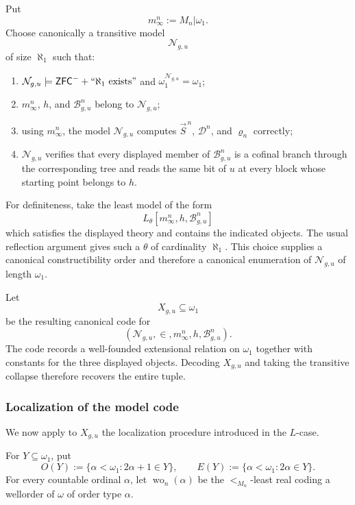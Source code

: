 \documentclass[a4paper,11pt]{article}
\newcommand{\ZFCminus}{\mathsf{ZFC}^{-}}
\begin{document}
Put
\[
   m^n_\infty:=M_n|\omega_1.
\]
Choose canonically a transitive model
\[
   \mathcal N_{g,u}
\]
of size $\aleph_1$ such that:
\begin{enumerate}
   \item
   $\mathcal N_{g,u}\models
      \ZFCminus+``\aleph_1\text{ exists}"$
   and $\omega_1^{\mathcal N_{g,u}}=\omega_1$;

   \item
   $m^n_\infty$, $h$, and $\mathcal B^n_{g,u}$ belong to
   $\mathcal N_{g,u}$;

   \item using $m^n_\infty$, the model $\mathcal N_{g,u}$ computes
   $\vec S^{\,n}$, $\mathcal D^n$, and $\varrho_n$ correctly;

   \item $\mathcal N_{g,u}$ verifies that every displayed member of
   $\mathcal B^n_{g,u}$ is a cofinal branch through the corresponding tree
   and reads the same bit of $u$ at every block whose starting point belongs
   to $h$.
\end{enumerate}
For definiteness, take the least model of the form
\[
   L_\theta[m^n_\infty,h,\mathcal B^n_{g,u}]
\]
which satisfies the displayed theory and contains the indicated objects.
The usual reflection argument gives such a $\theta$ of cardinality
$\aleph_1$.  This choice supplies a canonical constructibility order and
therefore a canonical enumeration of $\mathcal N_{g,u}$ of length
$\omega_1$.

Let
\[
   X_{g,u}\subseteq\omega_1
\]
be the resulting canonical code for
\[
   (\mathcal N_{g,u},\in,
       m^n_\infty,h,\mathcal B^n_{g,u}).
\]
The code records a well-founded extensional relation on $\omega_1$ together
with constants for the three displayed objects.  Decoding $X_{g,u}$ and taking
the transitive collapse therefore recovers the entire tuple.

\subsubsection*{Localization of the model code}

We now apply to $X_{g,u}$ the localization procedure introduced in the
$L$-case.

For $Y\subseteq\omega_1$, put
\[
   O(Y):=\{\alpha<\omega_1:2\alpha+1\in Y\},
   \qquad
   E(Y):=\{\alpha<\omega_1:2\alpha\in Y\}.
\]
For every countable ordinal $\alpha$, let $\operatorname{wo}_n(\alpha)$ be
the $<_{M_n}$-least real coding a wellorder of $\omega$ of order type
$\alpha$.
\end{document}
